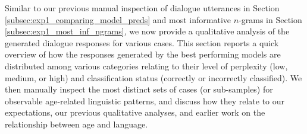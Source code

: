     
    
    
    



Similar to our previous manual inspection of dialogue utterances in Section \ref{subsec:exp1_comparing_model_preds} and most informative $n$-grams in Section \ref{subsec:exp1_most_inf_ngrams}, we now provide a qualitative analysis of the generated dialogue responses for various cases.
This section reports a quick overview of how the responses generated by the best performing models are distributed among various categories relating to their level of perplexity (low, medium, or high) and classification status (correctly or incorrectly classified).
We then manually inspect the most distinct sets of cases (or sub-samples) for observable age-related linguistic patterns, and discuss how they relate to our expectations, our previous qualitative analyses, and earlier work on the relationship between age and language.


